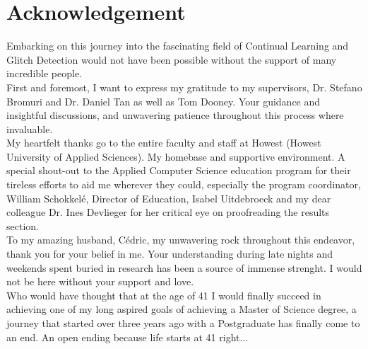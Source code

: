 \section*{Acknowledgement}
Embarking on this journey into the fascinating field of Continual Learning and Glitch Detection would not have been possible without the support of many incredible people. \\

First and foremost, I want to express my gratitude to my supervisors, Dr. Stefano Bromuri and Dr. Daniel Tan as well as Tom Dooney. Your guidance and insightful discussions, and unwavering patience throughout this process where invaluable. \\

My heartfelt thanks go to the entire faculty and staff at Howest (Howest University of Applied Sciences). My homebase and supportive environment. A special shout-out to the Applied Computer Science education program for their tireless efforts to aid me wherever they could, especially the program coordinator, William Schokkelé, Director of Education, Isabel Uitdebroeck and my dear colleague Dr. Ines Devlieger for her critical eye on proofreading the results section. \\

To my amazing husband, Cédric, my unwavering rock throughout this endeavor, thank you for your belief in me. Your understanding during late nights and weekends spent buried in research has been a source of immense strenght. I would not be here without your support and love.\\

Who would have thought that at the age of 41 I would finally succeed in achieving one of my long aspired goals of achieving a Master of Science degree, a journey that started over three years ago with a Postgraduate has finally come to an end. An open ending because life starts at 41 right...\\

